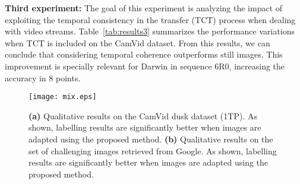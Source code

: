 \textbf{Third experiment:} The goal of this experiment is
analyzing the impact of exploiting the temporal consistency in the
transfer (TCT) process when dealing with video streams.
Table~\ref{tab:results3} summarizes the performance variations
when TCT is included on the CamVid dataset. From this results, we
can conclude that considering temporal coherence outperforms still
images. This improvement is specially relevant for Darwin in
sequence 6R0, increasing the accuracy in $8$ points.


\begin{figure*}[!t]
    \centering
    \texttt{[image: mix.eps]}
    \vspace{-5mm}
    \caption[Qualitative results for semantics transference]{\textbf{(a)} Qualitative results on the CamVid dusk dataset (1TP). As shown, labelling results are significantly better when images are adapted using the proposed method. \textbf{(b)} Qualitative results on the set of challenging images retrieved from Google. As shown, labelling results are significantly better when images are adapted using the proposed method.}
    \label{fig:1TP}
    \vspace{5mm}
\end{figure*}
